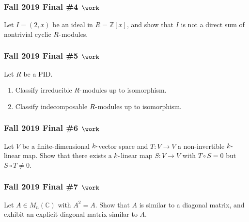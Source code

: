 \hypertarget{fall-2019-final-4-work}{%
\subsubsection{\texorpdfstring{Fall 2019 Final \#4
\(\work\)}{Fall 2019 Final \#4 \textbackslash work}}\label{fall-2019-final-4-work}}

Let \(I = (2, x)\) be an ideal in \(R = {\mathbb{Z}}[x]\), and show that
\(I\) is not a direct sum of nontrivial cyclic \(R{\hbox{-}}\)modules.

\hypertarget{fall-2019-final-5-work}{%
\subsubsection{\texorpdfstring{Fall 2019 Final \#5
\(\work\)}{Fall 2019 Final \#5 \textbackslash work}}\label{fall-2019-final-5-work}}

Let \(R\) be a PID.

\begin{enumerate}
\def\labelenumi{\alph{enumi}.}
\item
  Classify irreducible \(R{\hbox{-}}\)modules up to isomorphism.
\item
  Classify indecomposable \(R{\hbox{-}}\)modules up to isomorphism.
\end{enumerate}

\hypertarget{fall-2019-final-6-work}{%
\subsubsection{\texorpdfstring{Fall 2019 Final \#6
\(\work\)}{Fall 2019 Final \#6 \textbackslash work}}\label{fall-2019-final-6-work}}

Let \(V\) be a finite-dimensional \(k{\hbox{-}}\)vector space and
\(T:V\to V\) a non-invertible \(k{\hbox{-}}\)linear map. Show that there
exists a \(k{\hbox{-}}\)linear map \(S:V\to V\) with \(T\circ S = 0\)
but \(S\circ T\neq 0\).

\hypertarget{fall-2019-final-7-work}{%
\subsubsection{\texorpdfstring{Fall 2019 Final \#7
\(\work\)}{Fall 2019 Final \#7 \textbackslash work}}\label{fall-2019-final-7-work}}

Let \(A\in M_n({\mathbb{C}})\) with \(A^2 = A\). Show that \(A\) is
similar to a diagonal matrix, and exhibit an explicit diagonal matrix
similar to \(A\).

